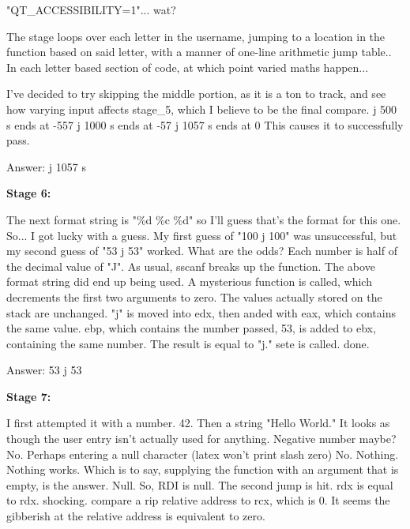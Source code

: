 \documentclass{article}
\begin{document}
    "QT\_ACCESSIBILITY=1"... wat?
    
    The stage loops over each letter in the username, jumping to a location in the function based on said letter, with a manner of one-line arithmetic jump table.. In each letter based section of code, at which point varied maths happen...
    
    I've decided to try skipping the middle portion, as it is a ton to track, and see how varying input affects stage\_5, which I believe to be the final compare.
    j 500 s ends at -557
    j 1000 s ends at -57
    j 1057 s ends at 0
    This causes it to successfully pass.

    \bigskip

    Answer: j 1057 s

    \bigskip

    \textbf{Stage 6:}

    \bigskip

    The next format string is "\%d \%c \%d" so I'll guess that's the format for this one.
    So... I got lucky with a guess.
    My first guess of "100 j 100" was unsuccessful, but my second guess of "53 j 53" worked. What are the odds?
    Each number is half of the decimal value of "J".
    As usual, sscanf breaks up the function. The above format string did end up being used.
    A mysterious function is called, which decrements the first two arguments to zero. The values actually stored on the stack are unchanged.
    "j" is moved into edx, then anded with eax, which contains the same value.
    ebp, which contains the number passed, 53, is added to ebx, containing the same number. The result is equal to "j." 
    sete is called.
    done.

    \bigskip

    Answer: 53 j 53

    \bigskip

    \textbf{Stage 7:}

    \bigskip

        I first attempted it with a number. 42. Then a string "Hello World."
It looks as though the user entry isn't actually used for anything.
Negative number maybe? No.
Perhaps entering a null character (latex won't print slash zero) No.
Nothing. Nothing works. Which is to say, supplying the function with an argument that is empty, is the answer. Null.
So, RDI is null.
The second jump is hit. rdx is equal to rdx. shocking.
compare a rip relative address to rcx, which is 0.
It seems the gibberish at the relative address is equivalent to zero.
\end{document}
